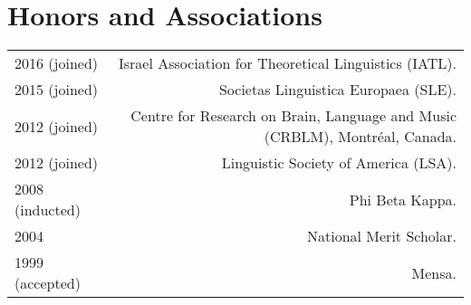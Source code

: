 \documentclass[12pt,letterpaper,twoside]{article}
\makeatletter
\newenvironment{cvsection}{%
  \begin{longtable}[l]{@{}L@{} @{}R@{}}
}{%
  \end{longtable}
}
\makeatother
\begin{document}
\section*{Honors and Associations}

\begin{cvsection}
  2016 {\footnotesize (joined)} & Israel Association for Theoretical Linguistics (IATL).\\
  2015 {\footnotesize (joined)} & Societas Linguistica Europaea (SLE).\\
  2012 {\footnotesize (joined)} & Centre for Research on Brain, Language and Music (CRBLM), Montr\'{e}al, Canada.\\
  2012 {\footnotesize (joined)} & Linguistic Society of America (LSA).\\
  2008 {\footnotesize (inducted)} & Phi Beta Kappa.\\
  2004 & National Merit Scholar.\\
  1999 {\footnotesize (accepted)} & Mensa.\\
\end{cvsection}
\end{document}
